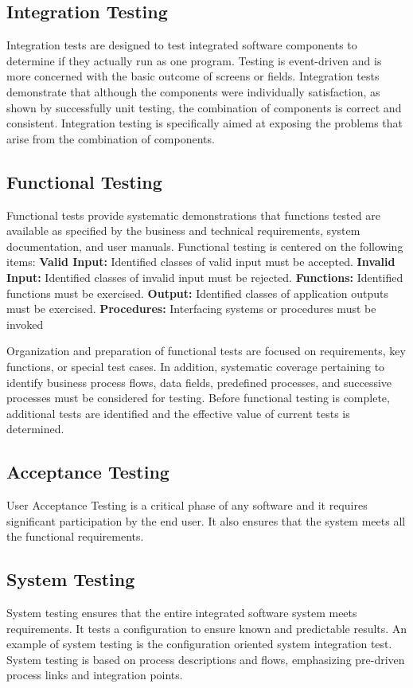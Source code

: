 \documentclass[BTech]{srmuthesis}
\begin{document}
\subsection{Integration Testing}
Integration tests are designed to test integrated software components to determine if they actually run as one program. Testing is event-driven and is more concerned with the basic outcome of screens or fields. Integration tests demonstrate that although the components were individually satisfaction, as shown by successfully unit testing, the combination of components is correct and consistent. Integration testing is specifically aimed at exposing the problems that arise from the combination of components.
\subsection{Functional Testing}
Functional tests provide systematic demonstrations that functions tested are available as specified by the business and technical requirements, system documentation, and user manuals.
Functional testing is centered on the following items:
\newline
\textbf{Valid Input:} Identified classes of valid input must be accepted.
\newline
\textbf{Invalid Input:} Identified classes of invalid input must be rejected.
\newline
\textbf{Functions:} Identified functions must be exercised.
\newline
\textbf{Output:} Identified classes of application outputs must be exercised.
\newline 
\textbf{Procedures:} Interfacing systems or procedures must be invoked
\par
Organization and preparation of functional tests are focused on requirements, key functions, or special test cases. In addition, systematic coverage pertaining to identify business process flows, data fields, predefined processes, and successive processes must be considered for testing. Before functional testing is complete, additional tests are identified and the effective value of current tests is determined.
\subsection{Acceptance Testing}
User Acceptance Testing is a critical phase of any software and it requires significant participation by the end user. It also ensures that the system meets all the functional requirements.
\subsection{System Testing}
System testing ensures that the entire integrated software system meets requirements. It tests a configuration to ensure known and predictable results. An example of system testing is the configuration oriented system integration test. System testing is based on process descriptions and flows, emphasizing pre-driven process links and integration points.
\end{document}

